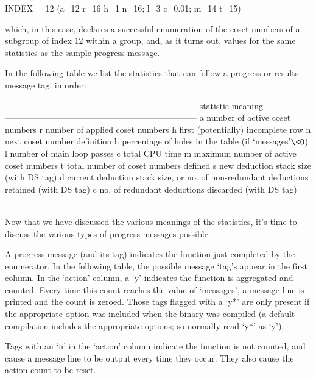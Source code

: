 \begintt
INDEX = 12 (a=12 r=16 h=1 n=16; l=3 c=0.01; m=14 t=15)
\endtt

which, in this case, declares a successful enumeration  of  the  coset
numbers of a subgroup of index 12 within a group,  and,  as  it  turns
out, values for the same statistics as the sample progress message.

In the following table we  list  the  statistics  that  can  follow  a
progress or results message tag, in order:

\begintt
--------------------------------------------------------------------
statistic   meaning
--------------------------------------------------------------------
a           number of active coset numbers
r           number of applied coset numbers
h           first (potentially) incomplete row
n           next coset number definition
h           percentage of holes in the table (if `messages'$ \< 0$) 
l           number of main loop passes
c           total CPU time
m           maximum number of active coset numbers
t           total number of coset numbers defined
s           new deduction stack size (with DS tag)
d           current deduction stack size, or
              no. of non-redundant deductions retained (with DS tag)
c           no. of redundant deductions discarded (with DS tag)
--------------------------------------------------------------------
\endtt

Now that we have discussed the various  meanings  of  the  statistics,
it's time to discuss the various types of progress messages possible.


A progress message (and its tag) indicates the function just completed
by the enumerator. In the following table, the possible message `tag's
appear in the first column. In the `action' column,  a  `y'  indicates
the function is aggregated and counted. Every time this count  reaches
the value of `messages', a message line is printed and  the  count  is
zeroed. Those tags flagged  with  a  `y*'  are  only  present  if  the
appropriate option was included when the {\ACE} binary was compiled (a
default compilation includes the appropriate options; so normally read
`y*' as `y').

Tags with an `n' in the `action' column indicate the function  is  not
counted, and cause a message line to be output every time they  occur.
They also cause the action count to be reset.

